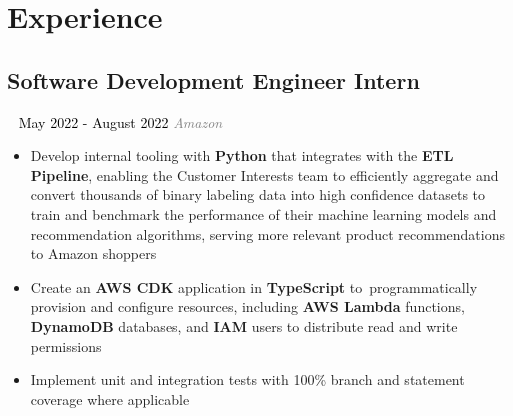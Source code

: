 \documentclass{article}
\newcommand{\resumesection}[3]{
    \subsection*{#1}
    \ 
    \normalsize
    \normalsize
    \hfill
    \textcolor{black}{#3}
    \normalsize
    \newline
    \small
    \textcolor{grey}{\emph{#2}}
}
\begin{document}
\section*{Experience}
\resumesection{Software Development Engineer Intern}{Amazon}{May 2022 - August 2022}
\begin{itemize}
    \item Develop internal tooling with \textbf{Python} that integrates with the \textbf{ETL Pipeline}, enabling the Customer Interests team to efficiently aggregate and convert thousands of binary labeling data into high confidence datasets to train and benchmark the performance of their machine learning models and recommendation algorithms, serving more relevant product recommendations to Amazon shoppers
    \item Create an \textbf{AWS CDK} application in \textbf{TypeScript} to\ programmatically provision and configure resources, including \textbf{AWS Lambda} functions, \textbf{DynamoDB} databases, and \textbf{IAM} users to distribute read and write permissions
    \item Implement unit and integration tests with 100\% branch and statement coverage where applicable
\end{itemize}
\end{document}
